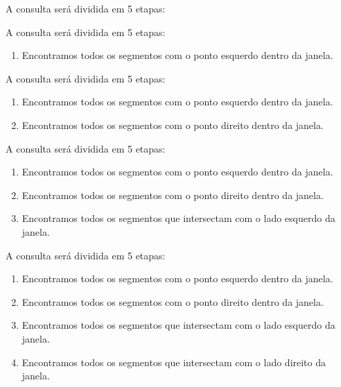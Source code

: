 \documentclass[
paper=128mm:96mm, %
fontsize=11pt, %
pagesize, %
parskip=half-, %
]{scrartcl} %
\theoremstyle{mythmstyle} %
\begin{document}
\clearpage

\begin{flushleft}
  A consulta será dividida em 5 etapas:\\    
\end{flushleft}
\clearpage
\begin{flushleft}
  A consulta será dividida em 5 etapas:\\
  \small
  \begin{enumerate}
  \item Encontramos todos os segmentos com o ponto esquerdo dentro da janela. 
  \end{enumerate}
\end{flushleft}
\clearpage
\begin{flushleft}
  A consulta será dividida em 5 etapas:\\
  \small
  \begin{enumerate}
  \item Encontramos todos os segmentos com o ponto esquerdo dentro da janela.
  \item Encontramos todos os segmentos com o ponto direito dentro da janela. 
  \end{enumerate}
\end{flushleft}
\clearpage
\begin{flushleft}
  A consulta será dividida em 5 etapas:\\
  \small
  \begin{enumerate}
  \item Encontramos todos os segmentos com o ponto esquerdo dentro da janela.
  \item Encontramos todos os segmentos com o ponto direito dentro da janela.
  \item Encontramos todos os segmentos que intersectam com o lado esquerdo da janela.
  \end{enumerate}
\end{flushleft}
\clearpage
\begin{flushleft}
  A consulta será dividida em 5 etapas:\\
  \small
  \begin{enumerate}
  \item Encontramos todos os segmentos com o ponto esquerdo dentro da janela.
  \item Encontramos todos os segmentos com o ponto direito dentro da janela.
  \item Encontramos todos os segmentos que intersectam com o lado esquerdo da janela.
  \item Encontramos todos os segmentos que intersectam com o lado direito da janela.
  \end{enumerate}
\end{flushleft}
\end{document}
